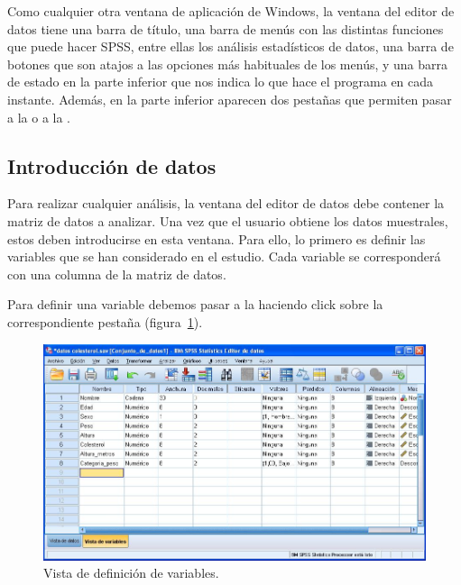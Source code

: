 Como cualquier otra ventana de aplicación de Windows, la ventana del editor de datos tiene una barra de título, una barra de menús con las distintas funciones que puede hacer SPSS, entre ellas los análisis estadísticos de datos, una barra de botones que son atajos a las opciones más habituales de los menús, y una barra de estado en la parte inferior que nos indica lo que hace el programa en cada instante. Además, en la parte inferior aparecen dos pestañas que permiten pasar a la  o a la .

\subsection{Introducción de datos}\label{s:introduccion_datos}
Para realizar cualquier análisis, la ventana del editor de datos debe contener la matriz de datos a analizar. Una vez que el usuario obtiene los datos muestrales, estos deben introducirse en esta ventana. Para ello, lo primero es definir las variables que se han considerado en el estudio. Cada variable se corresponderá con una columna de la matriz de datos. 

Para definir una variable debemos pasar a la  haciendo click sobre la correspondiente pestaña (figura~\ref{g:vista_variables}). 

\begin{figure}[h!]
\begin{center}
\includegraphics[scale=0.5]{introduccion_spss/img/vista_variables}
\caption{Vista de definición de variables.}
\label{g:vista_variables}
\end{center}
\end{figure}


